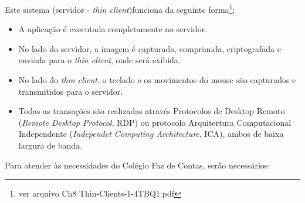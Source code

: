 \documentclass[a4paper,12pt]{report}
\begin{document}
            Este sistema (servidor - \emph{thin client})funciona da seguinte
            forma\footnote{ver arquivo Ch8 Thin-Clients-1-4TBQ1.pdf}:

            \begin{itemize}

                \item A aplicação é executada completamente no servidor.

                \item No lado do servidor, a imagem é capturada, comprimida,
                criptografada e enviada para o \emph{thin client}, onde será
                exibida.

                \item No lado do \emph{thin client}, o teclado e os movimentos
                do mouse são capturados e transmitidos para o servidor.

                \item Todas as transações são realizadas através Protocolos
                de Desktop Remoto (\emph{Remote Desktop Protocol}, RDP) ou
                protocolo Arquitertura Computacional Independente
                (\emph{Independet Computing Architecture}, ICA), ambos de baixa
                largura de banda.

            \end{itemize}

            Para atender às necessidades do Colégio Faz de Contas, serão
            necessários:
\end{document}
